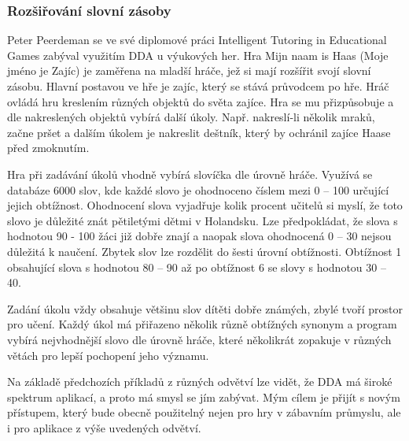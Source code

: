 \subsubsection{Rozšiřování slovní zásoby}

Peter Peerdeman se ve své diplomové práci Intelligent Tutoring in Educational Games\cite{14Haas} zabýval využitím DDA u výukových her. Hra Mijn naam is Haas (Moje jméno je Zajíc) je zaměřena na mladší hráče, jež si mají rozšířit svojí slovní zásobu. Hlavní postavou ve hře je zajíc, který se stává průvodcem po hře. Hráč ovládá hru kreslením různých objektů do světa zajíce. Hra se mu přizpůsobuje a dle nakreslených objektů vybírá další úkoly. Např. nakreslí-li několik mraků, začne pršet a dalším úkolem je nakreslit deštník, který by ochránil zajíce Haase před zmoknutím.

Hra při zadávání úkolů vhodně vybírá slovíčka dle úrovně hráče. Využívá se databáze 6000 slov, kde každé slovo je ohodnoceno číslem mezi 0 – 100 určující jejich obtížnost. Ohodnocení slova vyjadřuje kolik procent učitelů si myslí, že toto slovo je důležité znát pětiletými dětmi v Holandsku. Lze předpokládat, že slova s hodnotou 90 - 100 žáci již dobře znají a naopak slova ohodnocená 0 – 30 nejsou důležitá k naučení. Zbytek slov lze rozdělit do šesti úrovní obtížnosti. Obtížnost 1 obsahující slova s hodnotou 80 – 90 až po obtížnost 6 se slovy s hodnotou 30 – 40.

Zadání úkolu vždy obsahuje většinu slov dítěti dobře známých, zbylé tvoří prostor pro učení. Každý úkol má přiřazeno několik různě obtížných synonym a program vybírá nejvhodnější slovo dle úrovně hráče, které několikrát zopakuje v různých větách pro lepší pochopení jeho významu.

\vspace{8mm}

Na základě předchozích příkladů z různých odvětví lze vidět, že DDA má široké spektrum aplikací, a proto má smysl se jím zabývat. Mým cílem je přijít s novým přístupem, který bude obecně použitelný nejen pro hry v zábavním průmyslu, ale i pro aplikace z výše uvedených odvětví.

\endinput
